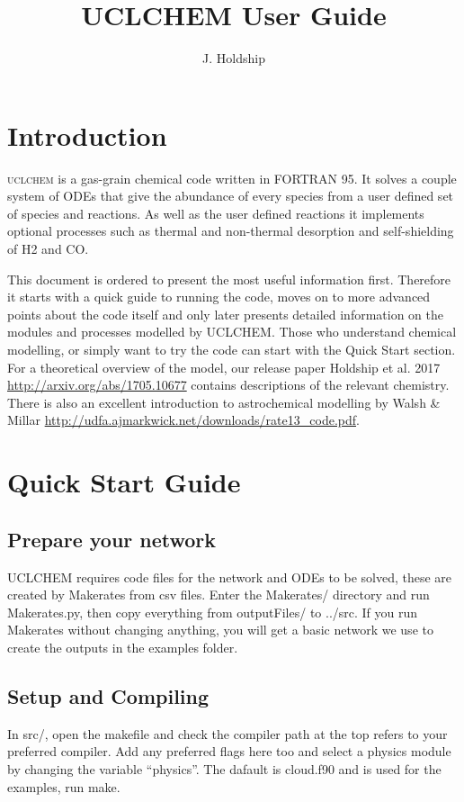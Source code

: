 \documentclass{llncs}
\begin{document}
\title{UCLCHEM User Guide}
\author{J. Holdship}

\maketitle

\section{Introduction}
\textsc{uclchem} is a gas-grain chemical code written in FORTRAN 95. It solves a couple system of ODEs that give the abundance of every species from a user defined set of species and reactions. As well as the user defined reactions it implements optional processes such as thermal and non-thermal desorption and self-shielding of H2 and CO.\par
%
This document is ordered to present the most useful information first. Therefore it starts with a quick guide to running the code, moves on to more advanced points about the code itself and only later presents detailed information on the modules and processes modelled by UCLCHEM. Those who understand chemical modelling, or simply want to try the code can start with the Quick Start section. For a theoretical overview of the model, our release paper Holdship et al. 2017 \url{http://arxiv.org/abs/1705.10677} contains descriptions of the relevant chemistry. There is also an excellent introduction to astrochemical modelling by Walsh \& Millar \url{http://udfa.ajmarkwick.net/downloads/rate13\_code.pdf}.

\section{Quick Start Guide}
\label{sec:quick}
%
\subsection{Prepare your network}
UCLCHEM requires code files for the network and ODEs to be solved, these are created by Makerates from csv files. Enter the Makerates/ directory and run Makerates.py, then copy everything from outputFiles/ to ../src. If you run Makerates without changing anything, you will get a basic network we use to create the outputs in the examples folder.
%
\subsection{Setup and Compiling}
In src/, open the makefile and check the compiler path at the top refers to your preferred compiler. Add any preferred flags here too and select a physics module by changing the variable ``physics''. The dafault is cloud.f90 and is used for the examples, run make.
%
\end{document}
